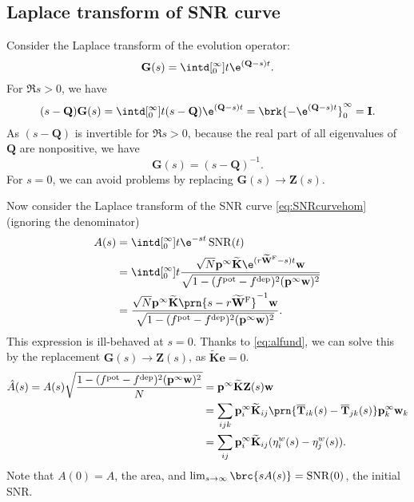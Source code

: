 \documentclass[12pt]{article}
\newcommand{\inv}{^{-1}}
\newcommand{\I}{\mathbf{I}}
\newcommand{\onev}{\mathbf{e}}
\newcommand{\MM}{\mathbf{Q}}
\newcommand{\pr}{\mathbf{p}}
\newcommand{\eq}{\pr^\infty}
\newcommand{\fpt}{\mathbf{T}}
\newcommand{\fptb}{\overline{\fpt}}
\newcommand{\fund}{\mathbf{Z}}
\newcommand{\w}{\mathbf{w}}
\newcommand{\W}{\mathbf{W}}
\newcommand{\enc}{\mathbf{K}}
\newcommand{\pot}{^{\text{pot}}}
\newcommand{\dep}{^{\text{dep}}}
\newcommand{\frgh}{\widetilde{\W}^{\mathrm{F}}}
\newcommand{\ench}{\widetilde{\enc}}
\DeclareMathOperator{\SNR}{SNR}
\begin{document}
\subsection{Laplace transform of SNR curve}\label{sec:laplaceSNR}

Consider the Laplace transform of the evolution operator:
%
\begin{equation}\label{eq:levol}
  \mathbf{G}(s) = \intd[_0^{\infty}]{t} \e^{(\MM-s) t}.
\end{equation}
%
For $\Re s>0$, we have
%
\begin{equation}\label{eq:levolcalc}
  (s-\MM)\mathbf{G}(s) = \intd[_0^{\infty}]{t} (s-\MM)\e^{(\MM-s) t} = \brk{-\e^{(\MM-s) t}}_0^{\infty} = \I.
\end{equation}
%
As $(s-\MM)$ is invertible for $\Re s>0$, because the real part of all eigenvalues of $\MM$ are nonpositive, we have
%
\begin{equation}\label{eq:levolres}
  \mathbf{G}(s) = (s-\MM)\inv.
\end{equation}
%
For $s=0$, we can avoid problems by replacing $\mathbf{G}(s) \to \fund(s)$.

Now consider the Laplace transform of the SNR curve \eqref{eq:SNRcurvehom} (ignoring the denominator)
%
\begin{equation}\label{eq:lsnr}
\begin{aligned}
  A(s) &= \intd[_0^{\infty}]{t} \e^{-st}\SNR(t) \\
   &= \intd[_0^{\infty}]{t} \frac{ \sqrt{N} \eq \ench \e^{(r\frgh-s)t} \w }{ \sqrt{1-(f\pot-f\dep)^2(\eq\w)^2} } \\
   &= \frac{\sqrt{N} \eq \ench \prn{s - r\frgh}\inv \w }{\sqrt{1-(f\pot-f\dep)^2(\eq\w)^2}}.
\end{aligned}
\end{equation}
%
This expression is ill-behaved at $s=0$.
Thanks to \eqref{eq:alfund}, we can solve this by the replacement $\mathbf{G}(s) \to \fund(s)$, as $\ench\onev=0$.
%
\begin{equation}\label{eq:larea}
\begin{aligned}
  \hat{A}(s) = A(s) \sqrt{\frac{{{1-(f\pot-f\dep)^2(\eq\w)^2}}}{N}}  &=  \eq \ench \fund(s) \w \\
    &= \sum_{ijk} \eq_i \ench_{ij} \prn{\fptb_{ik}(s)-\fptb_{jk}(s)} \eq_k \w_k \\
    &= \sum_{ij}  \eq_i \ench_{ij} (\eta^w_{i}(s) - \eta^w_{j}(s)).
\end{aligned}
\end{equation}
%
Note that $A(0)=A$, the area, and $\lim_{s\to\infty} \brc{sA(s)} = \SNR(0)$, the initial SNR.
\end{document}
